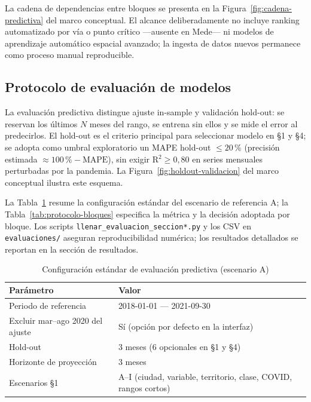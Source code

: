 La cadena de dependencias entre bloques se presenta en la Figura~\ref{fig:cadena-predictiva} del marco conceptual. El alcance deliberadamente no incluye ranking automatizado por vía o punto crítico ---ausente en Mede--- ni modelos de aprendizaje automático espacial avanzado; la ingesta de datos nuevos permanece como proceso manual reproducible.

\subsection{Protocolo de evaluación de modelos}

La evaluación predictiva distingue ajuste in-sample y validación hold-out: se reservan los últimos $N$ meses del rango, se entrena sin ellos y se mide el error al predecirlos. El hold-out es el criterio principal para seleccionar modelo en §1 y §4; se adopta como umbral exploratorio un MAPE hold-out $\leq 20\,\%$ (precisión estimada $\approx 100\,\% - \mathrm{MAPE}$), sin exigir R$^2 \geq 0{,}80$ en series mensuales perturbadas por la pandemia. La Figura~\ref{fig:holdout-validacion} del marco conceptual ilustra este esquema.

La Tabla~\ref{tab:config-evaluacion} resume la configuración estándar del escenario de referencia A; la Tabla~\ref{tab:protocolo-bloques} especifica la métrica y la decisión adoptada por bloque. Los scripts \texttt{llenar\_evaluacion\_seccion*.py} y los CSV en \texttt{evaluaciones/} aseguran reproducibilidad numérica; los resultados detallados se reportan en la sección de resultados.

\begin{table}[H]
	\centering
	\caption{Configuración estándar de evaluación predictiva (escenario A)}
	\label{tab:config-evaluacion}
	\small
	\begin{tabularx}{\linewidth}{@{}l X@{}}
		\toprule
		\textbf{Parámetro} & \textbf{Valor} \\
		\midrule
		Periodo de referencia & 2018-01-01 — 2021-09-30 \\
		Excluir mar–ago 2020 del ajuste & Sí (opción por defecto en la interfaz) \\
		Hold-out & 3 meses (6 opcionales en §1 y §4) \\
		Horizonte de proyección & 3 meses \\
		Escenarios §1 & A–I (ciudad, variable, territorio, clase, COVID, rangos cortos) \\
		\bottomrule
	\end{tabularx}
\end{table}

